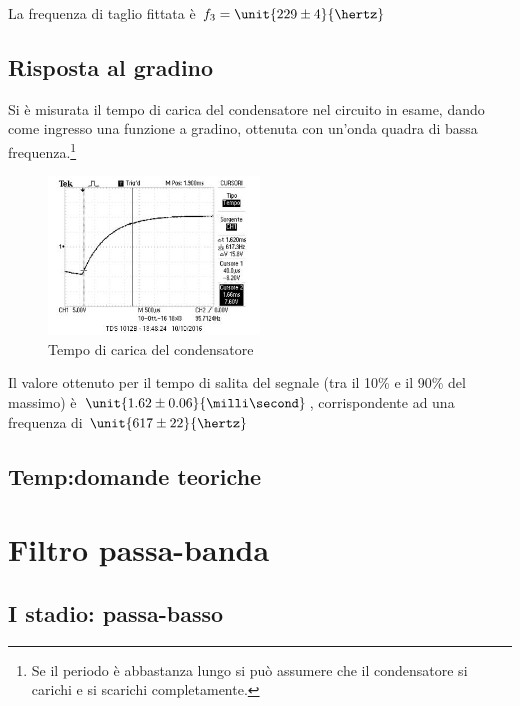 \documentclass[10pt,a4paper]{article}
\begin{document}
La frequenza di taglio fittata è $f_3 = \unit{229 \pm 4}{\hertz}$

\subsection{Risposta al gradino}
Si è misurata il tempo di carica del condensatore nel circuito in esame, dando come ingresso una funzione a gradino, ottenuta con un'onda quadra di bassa frequenza.\footnote{Se il periodo è abbastanza lungo si può assumere che il condensatore si carichi e si scarichi completamente.}

\begin{figure}[h]
	\centering
	\includegraphics[width=0.5\textwidth]{../oscilloscopio/raise_time.jpg}
	\caption{Tempo di carica del condensatore}
	\label{fig:raise}
\end{figure}

Il valore ottenuto per il tempo di salita del segnale (tra il 10\% e il 90\% del massimo) è $\unit{1.62 \pm 0.06}{\milli\second}$, corrispondente ad una frequenza di $\unit{617 \pm 22}{\hertz}$

\subsection{Temp:domande teoriche}

\section{Filtro passa-banda}

\subsection{I stadio: passa-basso}
\end{document}
